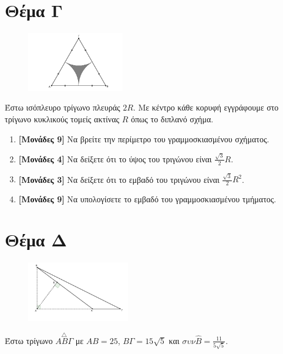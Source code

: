 \documentclass[12pt]{article}
\begin{document}
\section*{Θέμα Γ}
  \noindent
  \begin{figure}
    \centering
    \vspace{-50pt}
    \includegraphics[width=0.38\textwidth]{2017BGeo3}
  \end{figure}

  Έστω ισόπλευρο τρίγωνο πλευράς $2R$. Με κέντρο κάθε κορυφή εγγράφουμε στο τρίγωνο κυκλικούς τομείς ακτίνας $R$ όπως το διπλανό σχήμα.
  \begin{enumerate}
    \item \textbf{[Μονάδες 9]}  Να βρείτε την περίμετρο του γραμμοσκιασμένου σχήματος.
    \item \textbf{[Μονάδες 4]}  Να δείξετε ότι το ύψος του τριγώνου είναι $\frac{\sqrt{3}}{2}R$.
    \item \textbf{[Μονάδες 3]}  Να δείξετε ότι το εμβαδό του τριγώνου είναι $\frac{\sqrt{3}}{2}R^2$.
    \item \textbf{[Μονάδες 9]}  Να υπολογίσετε το εμβαδό του γραμμοσκιασμένου τμήματος.
  \end{enumerate}

\section*{Θέμα Δ}
  \noindent
  \begin{figure}
    \centering
    \vspace{-50pt}
    \includegraphics[width=0.4\textwidth]{2017BGeo4}
  \end{figure}

  Έστω τρίγωνο $\overset{\triangle}{ΑΒΓ}$ με $ΑΒ=25$, $ΒΓ=15\sqrt{5}$ και $συν\hat{Β}=\frac{11}{5\sqrt{5}}$.
\end{document}
